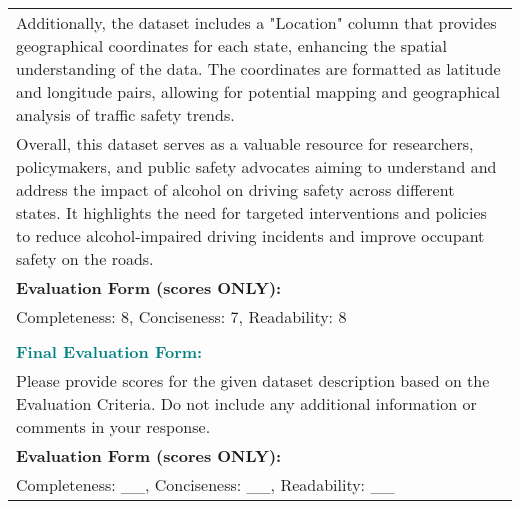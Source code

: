 \begin{table*}
\begin{tabular}{p{14cm}}
    Additionally, the dataset includes a "Location" column that provides geographical coordinates for each state, enhancing the spatial understanding of the data. The coordinates are formatted as latitude and longitude pairs, allowing for potential mapping and geographical analysis of traffic safety trends. \\
    Overall, this dataset serves as a valuable resource for researchers, policymakers, and public safety advocates aiming to understand and address the impact of alcohol on driving safety across different states. It highlights the need for targeted interventions and policies to reduce alcohol-impaired driving incidents and improve occupant safety on the roads. \\
    \textbf{Evaluation Form (scores ONLY):} \\
    Completeness: 8, Conciseness: 7, Readability: 8 \\
    \\
    \textcolor{teal}{\textbf{Final Evaluation Form:}} \\
    Please provide scores for the given dataset description based on the Evaluation Criteria. Do not include any additional information or comments in your response. \\
    \textbf{Evaluation Form (scores ONLY):} \\
    Completeness: \_\_, Conciseness: \_\_, Readability: \_\_ \\
    \bottomrule
    \end{tabular}
    \caption{Guidelines for evaluating dataset descriptions based on completeness, conciseness, and readability.}
    \label{tab:llm_eval_comp_conc_read}
\end{table*}
